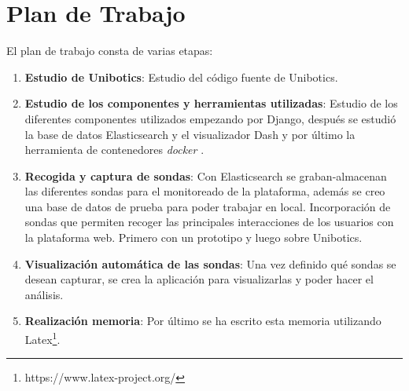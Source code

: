 \section{Plan de Trabajo}
El plan de trabajo consta de varias etapas:

\begin{enumerate}
\item \textbf{Estudio de Unibotics}: Estudio del código fuente de Unibotics.
\item \textbf{Estudio de los componentes y herramientas utilizadas}: Estudio de los diferentes componentes utilizados empezando por Django, después se estudió la base de datos Elasticsearch y el visualizador Dash y por último la herramienta de contenedores \textit{docker} .
\item \textbf{Recogida y captura de sondas}: Con Elasticsearch se graban-almacenan las diferentes sondas para el monitoreado de la plataforma, además se creo una base de datos de prueba para poder trabajar en local. Incorporación de sondas que permiten recoger las principales interacciones de los usuarios con la plataforma web. Primero con un prototipo y luego sobre Unibotics.
\item \textbf{Visualización automática de las sondas}: Una vez definido qué sondas se desean capturar, se crea la aplicación para visualizarlas y poder hacer el análisis.
\item \textbf{Realización memoria}: Por último se ha escrito esta memoria utilizando Latex\footnote{https://www.latex-project.org/}.
\end{enumerate}








